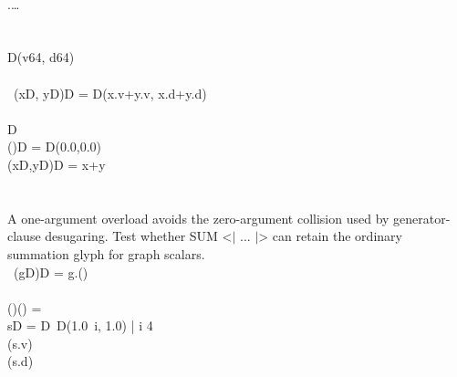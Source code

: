 \documentclass{article}
\begin{document}
\begin{preview}
\begin{FortressCode}
  \\
 .\lbrace\ldots\rbrace \\
  \\
 \\
 D(v\COLON{}64, d\COLON{}64) \\
 \\
\, \mathord{+}(x\COLONOP{}D, y\COLONOP{}D)\COLONOP{}D = D(x.v+y.v, x.d+y.d) \\
 \\
   \llbracket{}D\rrbracket \\
\2\+(\ultrathin)\COLONOP{}D = D(0.0,0.0) \\
  (x\COLONOP{}D,y\COLONOP{}D)\COLONOP{}D = x+y\- \\
 \\
 \\
\FortressBeginFlushRightComment A one-argument overload avoids the zero-argument collision used by
generator-clause desugaring.  Test whether SUM <{$|$} ... {$|$}> can retain the
ordinary summation glyph for graph scalars. \FortressEndComment \\
\, \mathord{\sum}\bigl(g\COLON{}\llbracket{}D\rrbracket\bigr)\COLONOP{}D = g.() \\
 \\
(\ultrathin)\COLON(\ultrathin) =\;  \\
\2\+s\COLONOP{}D = \sum \bigl\langle\llbracket{}D\rrbracket\, D(1.0\, i, 1.0) \bigm| i \mathbin{\#}4\,\bigr\rangle \\
  (s.v) \\
  (s.d)\- \\
 \\
\end{FortressCode}
\end{preview}
\end{document}
